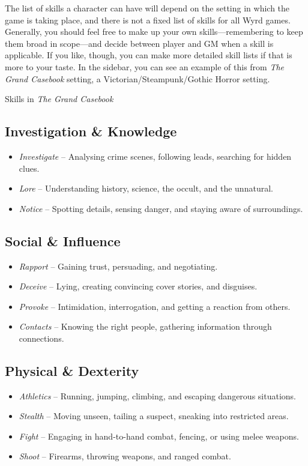 The list of skills a character can have will depend on the setting in which the game is taking place, and there is not a fixed list of skills for all Wyrd games. Generally, you should feel free to make up your own skills---remembering to keep them broad in scope---and decide between player and GM when a skill is applicable. If you like, though, you can make more detailed skill lists if that is more to your taste. In the sidebar, you can see an example of this from \emph{The Grand Casebook} setting, a Victorian/Steampunk/Gothic Horror setting.

\begin{DndSidebar}[float=!b]{Skills in \emph{The Grand Casebook}}
\subsection*{Investigation \& Knowledge}  
\begin{itemize}
    \item \emph{Investigate} – Analysing crime scenes, following leads, searching for hidden clues.
    \item \emph{Lore} – Understanding history, science, the occult, and the unnatural.
    \item \emph{Notice} – Spotting details, sensing danger, and staying aware of surroundings.
\end{itemize}

\subsection*{Social \& Influence}  
\begin{itemize}
    \item \emph{Rapport} – Gaining trust, persuading, and negotiating.
    \item \emph{Deceive} – Lying, creating convincing cover stories, and disguises.
    \item \emph{Provoke} – Intimidation, interrogation, and getting a reaction from others.
    \item \emph{Contacts} – Knowing the right people, gathering information through connections.
\end{itemize}

\subsection*{Physical \& Dexterity}  
\begin{itemize}
    \item \emph{Athletics} – Running, jumping, climbing, and escaping dangerous situations.
    \item \emph{Stealth} – Moving unseen, tailing a suspect, sneaking into restricted areas.
    \item \emph{Fight} – Engaging in hand-to-hand combat, fencing, or using melee weapons.
    \item \emph{Shoot} – Firearms, throwing weapons, and ranged combat.
\end{itemize}


\end{DndSidebar}
